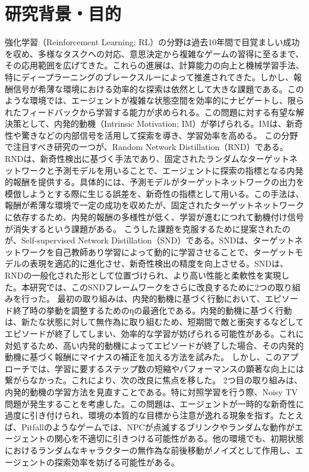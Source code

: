 \section{研究背景・目的}
強化学習（Reinforcement Learning; RL）の分野は過去10年間で目覚ましい成功を収め、多様なタスクへの対応、意思決定から複雑なゲームの習得に至るまで、その応用範囲を広げてきた。これらの進展は、計算能力の向上と機械学習手法、特にディープラーニングのブレークスルーによって推進されてきた。しかし、報酬信号が希薄な環境における効率的な探索は依然として大きな課題である。このような環境では、エージェントが複雑な状態空間を効率的にナビゲートし、限られたフィードバックから学習する能力が求められる。この問題に対する有望な解決策として、内発的動機（Intrinsic Motivation; IM）が挙げられる。IMは、新奇性や驚きなどの内部信号を活用して探索を導き、学習効率を高める。
この分野で注目すべき研究の一つが、Random Network Distillation（RND）である。RNDは、新奇性検出に基づく手法であり、固定されたランダムなターゲットネットワークと予測モデルを用いることで、エージェントに探索の指標となる内発的報酬を提供する。具体的には、予測モデルがターゲットネットワークの出力を模倣しようとする際に生じる誤差を、新奇性の指標として用いる。この手法は、報酬が希薄な環境で一定の成功を収めたが、固定されたターゲットネットワークに依存するため、内発的報酬の多様性が低く、学習が進むにつれて動機付け信号が消失するという課題がある。
こうした課題を克服するために提案されたのが、Self-supervised Network Distillation（SND）である。SNDは、ターゲットネットワークを自己教師あり学習によって動的に学習させることで、ターゲットモデルの表現を適応的に進化させ、新奇性検出の精度を向上させる。SNDは、RNDの一般化された形として位置づけられ、より高い性能と柔軟性を実現した。本研究では、このSNDフレームワークをさらに改良するために2つの取り組みを行った。
最初の取り組みは、内発的動機に基づく行動において、エピソード終了時の挙動を調整するためのηの最適化である。内発的動機に基づく行動は、新たな状態に対して無作為に取り組むため、短期間で敵と衝突するなどしてエピソードが終了してしまい、効率的な学習が妨げられる可能性がある。これに対処するため、高い内発的動機によってエピソードが終了した場合、その内発的動機に基づく報酬にマイナスの補正を加える方法を試みた。
しかし、このアプローチでは、学習に要するステップ数の短縮やパフォーマンスの顕著な向上には繋がらなかった。これにより、次の改良に焦点を移した。
2つ目の取り組みは、内発的動機の学習方法を見直すことである。特に対照学習を行う際、Noisy TV問題が発生することを考慮した。この問題は、エージェントが一時的な新奇性に過度に引き付けられ、環境の本質的な目標から注意が逸れる現象を指す。たとえば、Pitfallのようなゲームでは、NPCが点滅するブリンクやランダムな動作がエージェントの関心を不適切に引きつける可能性がある。他の環境でも、初期状態におけるランダムなキャラクターの無作為な前後移動がノイズとして作用し、エージェントの探索効率を妨げる可能性がある。
